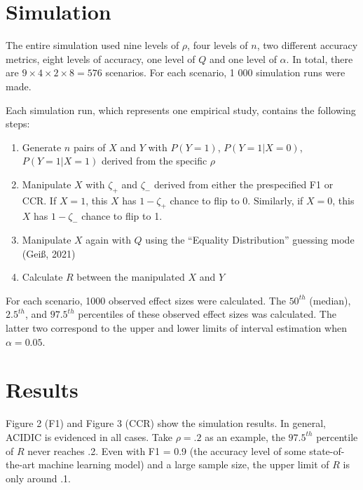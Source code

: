 \documentclass[english,man,floatsintext]{apa6}
\providecommand{\tightlist}{%
  \setlength{\itemsep}{0pt}\setlength{\parskip}{0pt}}
\begin{document}
\hypertarget{simulation}{%
\section{Simulation}\label{simulation}}

The entire simulation used nine levels of \(\rho\), four levels of \(n\), two different accuracy metrics, eight levels of accuracy, one level of \(Q\) and one level of \(\alpha\). In total, there are \(9 \times 4 \times 2 \times 8 = 576\) scenarios. For each scenario, 1 000 simulation runs were made.

Each simulation run, which represents one empirical study, contains the following steps:

\begin{enumerate}
\def\labelenumi{\arabic{enumi}.}
\tightlist
\item
  Generate \(n\) pairs of \(X\) and \(Y\) with \(P(Y=1)\), \(P(Y=1|X=0)\), \(P(Y=1|X=1)\) derived from the specific \(\rho\)
\item
  Manipulate \(X\) with \(\zeta_{+}\) and \(\zeta_{-}\) derived from either the prespecified F1 or CCR. If \(X = 1\), this \(X\) has \(1 - \zeta_{+}\) chance to flip to 0. Similarly, if \(X = 0\), this \(X\) has \(1 - \zeta_{-}\) chance to flip to 1.
\item
  Manipulate \(X\) again with \(Q\) using the \enquote{Equality Distribution} guessing mode (Geiß, 2021)
\item
  Calculate \(R\) between the manipulated \(X\) and \(Y\)
\end{enumerate}

For each scenario, 1000 observed effect sizes were calculated. The \(50^{th}\) (median), \(2.5^{th}\), and \(97.5^{th}\) percentiles of these observed effect sizes was calculated. The latter two correspond to the upper and lower limits of interval estimation when \(\alpha = 0.05\).

\hypertarget{results}{%
\section{Results}\label{results}}

Figure 2 (F1) and Figure 3 (CCR) show the simulation results. In general, ACIDIC is evidenced in all cases. Take \(\rho = .2\) as an example, the \(97.5^{th}\) percentile of \(R\) never reaches .2. Even with F1 = 0.9 (the accuracy level of some state-of-the-art machine learning model) and a large sample size, the upper limit of \(R\) is only around .1.
\end{document}
